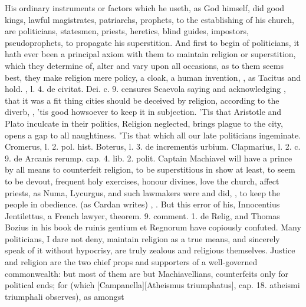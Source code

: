 {His ordinary instruments or factors which he useth, as God himself, did
good kings, lawful magistrates, patriarchs, prophets, to the
establishing of his church, are politicians, statesmen, priests,
heretics, blind guides, impostors, pseudoprophets, to propagate his
superstition. And first to begin of politicians, it hath ever been a
principal axiom with them to maintain religion or superstition, which
they determine of, alter and vary upon all occasions, as to them seems
best, they make religion mere policy, a cloak, a human invention, , as Tacitus
and \Tully hold. \Austin{}, \textlatin{l. 4. de civitat. Dei. c. 9.} censures
Scaevola saying and acknowledging ,
that it was a fit thing cities should be deceived by religion,
according to the diverb, , 'tis good howsoever to keep it
in subjection. 'Tis that Aristotle and Plato inculcate in
their politics, Religion neglected, brings plague to the city, opens a
gap to all naughtiness. 'Tis that which all our late politicians
ingeminate. Cromerus, \textlatin{l. 2. pol. hist.} Boterus, \textlatin{l. 3. de incrementis
urbium}. Clapmarius, \textlatin{l. 2. c. 9. de Arcanis rerump. cap. 4. lib. 2.
polit}. Captain Machiavel will have a prince by all means to counterfeit
religion, to be superstitious in show at least, to seem to be devout,
frequent holy exercises, honour divines, love the church, affect
priests, as Numa, Lycurgus, and such lawmakers were and did, , to keep the people in obedience.  (as
Cardan writes) , \etc{}. But this error of his, Innocentius Jentilettus, a
French lawyer, \textlatin{theorem. 9. comment. 1. de Relig}, and Thomas Bozius in
his book \textlatin{de ruinis gentium et Regnorum} have copiously confuted. Many
politicians, I dare not deny, maintain religion as a true means, and
sincerely speak of it without hypocrisy, are truly zealous and
religious themselves. Justice and religion are the two chief props and
supporters of a well-governed commonwealth: but most of them are but
Machiavellians, counterfeits only for political ends; for 
(which [Campanella][\textlatin{Atheismus triumphatus}], \textlatin{cap. 18. atheismi triumphali} observes), as amongst
}
